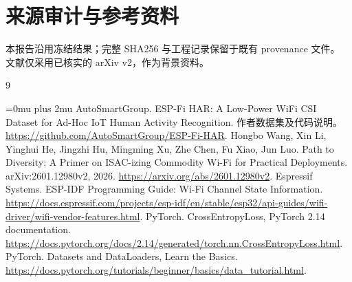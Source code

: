 \documentclass[UTF8,zihao=-4,fontset=none]{ctexart}
\begin{document}
\section{来源审计与参考资料}
本报告沿用冻结结果；完整 SHA256 与工程记录保留于既有 provenance 文件。
文献\cite{diversity}仅采用已核实的 arXiv v2，作为背景资料。

\begin{thebibliography}{9}\small
\setlength{\itemsep}{6pt}\setlength{\parskip}{0pt}
\setlength{\labelsep}{0.6em}
\setlength{\leftmargin}{2em}\setlength{\itemindent}{0pt}
\raggedright{}\Urlmuskip=0mu plus 2mu\relax
{} AutoSmartGroup. ESP-Fi HAR: A Low-Power WiFi CSI Dataset for Ad-Hoc IoT Human Activity Recognition. 作者数据集及代码说明。\url{https://github.com/AutoSmartGroup/ESP-Fi-HAR}.
 Hongbo Wang, Xin Li, Yinghui He, Jingzhi Hu, Mingming Xu, Zhe Chen, Fu Xiao, Jun Luo. Path to Diversity: A Primer on ISAC-izing Commodity Wi-Fi for Practical Deployments. arXiv:2601.12980v2, 2026. \url{https://arxiv.org/abs/2601.12980v2}.
 Espressif Systems. ESP-IDF Programming Guide: Wi-Fi Channel State Information. \url{https://docs.espressif.com/projects/esp-idf/en/stable/esp32/api-guides/wifi-driver/wifi-vendor-features.html}.
 PyTorch. CrossEntropyLoss, PyTorch 2.14 documentation. \url{https://docs.pytorch.org/docs/2.14/generated/torch.nn.CrossEntropyLoss.html}.
 PyTorch. Datasets and DataLoaders, Learn the Basics. \url{https://docs.pytorch.org/tutorials/beginner/basics/data_tutorial.html}.
\end{thebibliography}
\end{document}
